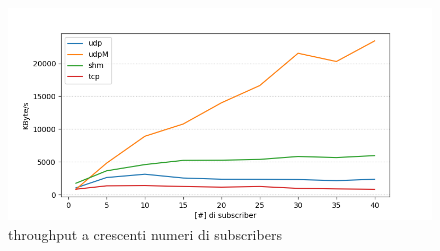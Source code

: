 

\begin{figure}[H]
    \includegraphics[width=\textwidth]{./results/test3_graph_throughput.png} 
    \caption{throughput a crescenti numeri di subscribers} 
    \label{fig:throughput_increasing}
\end{figure}

